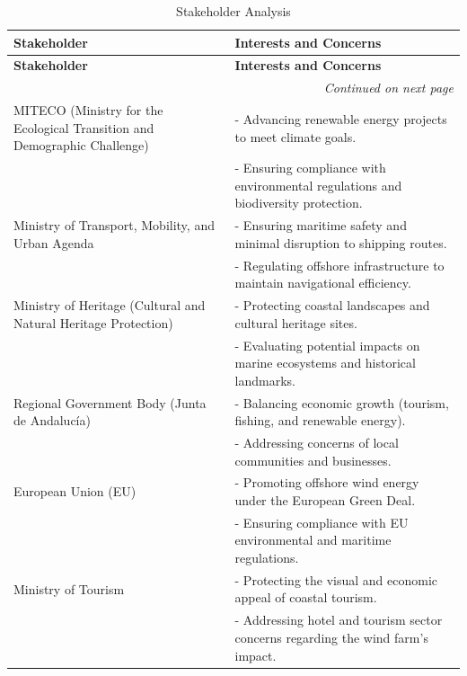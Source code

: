 \documentclass{article}
\begin{document}
\begin{longtable}{p{4cm} p{10cm}}
    \caption{Stakeholder Analysis} \\
    \toprule
    \textbf{Stakeholder} & \textbf{Interests and Concerns} \\
    \midrule
    \endfirsthead
    
    \toprule
    \textbf{Stakeholder} & \textbf{Interests and Concerns} \\
    \midrule
    \endhead
    
    \midrule
    \multicolumn{2}{r}{\textit{Continued on next page}} \\
    \midrule
    \endfoot
    
    \bottomrule
    \endlastfoot

    MITECO (Ministry for the Ecological Transition and Demographic Challenge) &
    - Advancing renewable energy projects to meet climate goals. \\
    & - Ensuring compliance with environmental regulations and biodiversity protection. \\
    \midrule
    Ministry of Transport, Mobility, and Urban Agenda &
    - Ensuring maritime safety and minimal disruption to shipping routes. \\
    & - Regulating offshore infrastructure to maintain navigational efficiency. \\

    Ministry of Heritage (Cultural and Natural Heritage Protection) &
    - Protecting coastal landscapes and cultural heritage sites. \\
    & - Evaluating potential impacts on marine ecosystems and historical landmarks. \\

    Regional Government Body (Junta de Andalucía) &
    - Balancing economic growth (tourism, fishing, and renewable energy). \\
    & - Addressing concerns of local communities and businesses. \\

    European Union (EU) &
    - Promoting offshore wind energy under the European Green Deal. \\
    & - Ensuring compliance with EU environmental and maritime regulations. \\

    Ministry of Tourism &
    - Protecting the visual and economic appeal of coastal tourism. \\
    & - Addressing hotel and tourism sector concerns regarding the wind farm’s impact. \\


\end{longtable}
\end{document}
